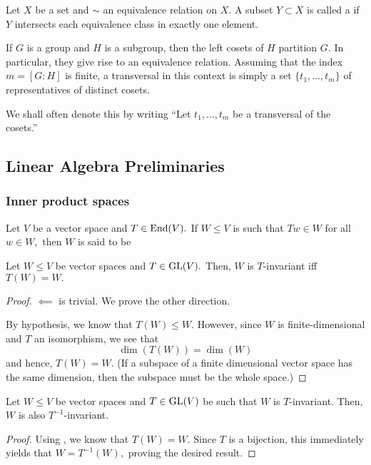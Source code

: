 \begin{defn}%
	\label{defn:transversal}
	Let $X$ be a set and $\sim$ an equivalence relation on $X.$ A subset $Y \subset X$ is called a  if $Y$ intersects each equivalence class in exactly one element.	
\end{defn}

\begin{ex}
	If $G$ is a group and $H$ is a subgroup, then the left cosets of $H$ partition $G.$ In particular, they give rise to an equivalence relation. Assuming that the index $m = [G:H]$ is finite, a transversal in this context is simply a set $\{t_1, \ldots, t_m\}$ of representatives of distinct cosets.

	We shall often denote this by writing ``Let $t_1, \ldots, t_m$ be a transversal of the cosets.''
\end{ex}

%
%
\subsection{Linear Algebra Preliminaries}
\subsubsection{Inner product spaces} \label{subsec:ips}
\begin{defn}
	Let $V$ be a vector space and $T \in \operatorname{End}(V).$ If $W \le V$ is such that $Tw \in W$ for all $w \in W,$ then $W$ is said to be 
\end{defn}

\begin{prop} \label{prop:TinvariantiffimageW}
	Let $W \le V$ be vector spaces and $T \in \operatorname{GL}(V).$ Then, $W$ is $T$-invariant iff $T(W) = W.$
\end{prop}
\begin{proof} 
	$\impliedby$ is trivial. We prove the other direction.

	By hypothesis, we know that $T(W) \le W.$ However, since $W$ is finite-dimensional and $T$ an isomorphism, we see that
	\begin{equation*} 
		\dim(T(W)) = \dim(W)
	\end{equation*}
	and hence, $T(W) = W.$ (If a subspace of a finite dimensional vector space has the same dimension, then the subspace must be the whole space.)
\end{proof}

\begin{prop} \label{prop:Tinverseinvariance}
	Let $W \le V$ be vector spaces and $T \in \operatorname{GL}(V)$ be such that $W$ is $T$-invariant. Then, $W$ is also $T^{-1}$-invariant.
\end{prop}
\begin{proof} 
	Using , we know that $T(W) = W.$ Since $T$ is a bijection, this immediately yields that $W = T^{-1}(W),$ proving the desired result.
\end{proof}

